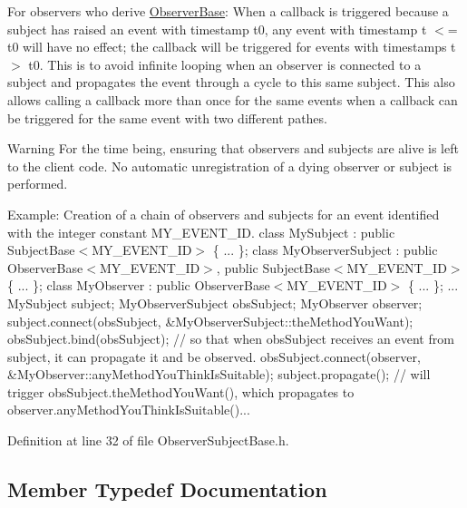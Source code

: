 For observers who derive \hyperlink{classocra_1_1ObserverBase}{Observer\+Base}\+: When a callback is triggered because a subject has raised an event with timestamp t0, any event with timestamp t $<$= t0 will have no effect; the callback will be triggered for events with timestamps t $>$ t0. This is to avoid infinite looping when an observer is connected to a subject and propagates the event through a cycle to this same subject. This also allows calling a callback more than once for the same events when a callback can be triggered for the same event with two different pathes.

\begin{DoxyWarning}{Warning}
For the time being, ensuring that observers and subjects are alive is left to the client code. No automatic unregistration of a dying observer or subject is performed.
\end{DoxyWarning}
Example\+:  Creation of a chain of observers and subjects for an event identified with the integer constant M\+Y\+\_\+\+E\+V\+E\+N\+T\+\_\+\+ID. class My\+Subject \+: public Subject\+Base$<$\+M\+Y\+\_\+\+E\+V\+E\+N\+T\+\_\+\+I\+D$>$ \{ ... \}; class My\+Observer\+Subject \+: public Observer\+Base$<$\+M\+Y\+\_\+\+E\+V\+E\+N\+T\+\_\+\+I\+D$>$, public Subject\+Base$<$\+M\+Y\+\_\+\+E\+V\+E\+N\+T\+\_\+\+I\+D$>$ \{ ... \}; class My\+Observer \+: public Observer\+Base$<$\+M\+Y\+\_\+\+E\+V\+E\+N\+T\+\_\+\+I\+D$>$ \{ ... \}; ... My\+Subject subject; My\+Observer\+Subject obs\+Subject; My\+Observer observer; subject.\+connect(obs\+Subject, \&\+My\+Observer\+Subject\+::the\+Method\+You\+Want); obs\+Subject.\+bind(obs\+Subject); // so that when obs\+Subject receives an event from subject, it can propagate it and be observed. obs\+Subject.\+connect(observer, \&\+My\+Observer\+::any\+Method\+You\+Think\+Is\+Suitable); subject.\+propagate(); // will trigger obs\+Subject.\+the\+Method\+You\+Want(), which propagates to observer.\+any\+Method\+You\+Think\+Is\+Suitable()...  

Definition at line 32 of file Observer\+Subject\+Base.\+h.



\subsection{Member Typedef Documentation}
\hypertarget{classocra_1_1ObserverBase_ad31fb33848323db6c887427f7dbf5c42}{}\label{classocra_1_1ObserverBase_ad31fb33848323db6c887427f7dbf5c42} 
